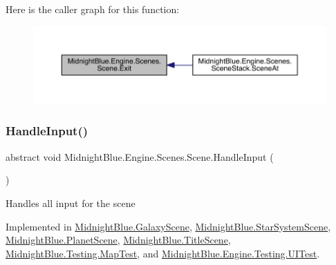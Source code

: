 Here is the caller graph for this function\+:
\nopagebreak
\begin{figure}[H]
\begin{center}
\leavevmode
\includegraphics[width=350pt]{class_midnight_blue_1_1_engine_1_1_scenes_1_1_scene_adbf0f6d758df9fc5e20f24f327599e67_icgraph}
\end{center}
\end{figure}
\hypertarget{class_midnight_blue_1_1_engine_1_1_scenes_1_1_scene_a2f7849ef8976f9aeed0023448033b6fd}{}\label{class_midnight_blue_1_1_engine_1_1_scenes_1_1_scene_a2f7849ef8976f9aeed0023448033b6fd} 
\subsubsection{\texorpdfstring{Handle\+Input()}{HandleInput()}}
{\footnotesize\ttfamily abstract void Midnight\+Blue.\+Engine.\+Scenes.\+Scene.\+Handle\+Input (\begin{DoxyParamCaption}{ }\end{DoxyParamCaption})\hspace{0.3cm}{\ttfamily [pure virtual]}}



Handles all input for the scene 



Implemented in \hyperlink{class_midnight_blue_1_1_galaxy_scene_afd7f8c9f6d0cf6ded10299d4b0015c29}{Midnight\+Blue.\+Galaxy\+Scene}, \hyperlink{class_midnight_blue_1_1_star_system_scene_a9fd64901322082a4da8658650257163d}{Midnight\+Blue.\+Star\+System\+Scene}, \hyperlink{class_midnight_blue_1_1_planet_scene_a6c84a639f27b9f7510b514969d47d1bd}{Midnight\+Blue.\+Planet\+Scene}, \hyperlink{class_midnight_blue_1_1_title_scene_a54dc02f150eb90dac2fcc6e37a077723}{Midnight\+Blue.\+Title\+Scene}, \hyperlink{class_midnight_blue_1_1_testing_1_1_map_test_ad7e54e4aec415ccf6e89ce8a8876d259}{Midnight\+Blue.\+Testing.\+Map\+Test}, and \hyperlink{class_midnight_blue_1_1_engine_1_1_testing_1_1_u_i_test_a6c891f10050ee05fddb5c6d177e80782}{Midnight\+Blue.\+Engine.\+Testing.\+U\+I\+Test}.

